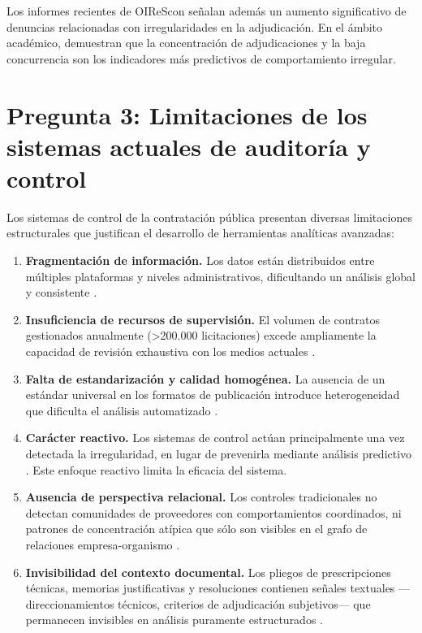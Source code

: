 \documentclass[11pt,a4paper,spanish]{book}
\numberwithin{equation}{chapter}
\numberwithin{figure}{chapter}
\begin{document}
Los informes recientes de OIReScon \cite{OIReScon2025} se{\~n}alan adem{\'a}s un aumento significativo de denuncias relacionadas con irregularidades en la adjudicaci{\'o}n. En el {\'a}mbito acad{\'e}mico,  demuestran que la concentraci{\'o}n de adjudicaciones y la baja concurrencia son los indicadores m{\'a}s predictivos de comportamiento irregular.

\section{Pregunta 3: Limitaciones de los sistemas actuales de auditor{\'i}a y control}

Los sistemas de control de la contrataci{\'o}n p{\'u}blica presentan diversas limitaciones estructurales que justifican el desarrollo de herramientas anal{\'i}ticas avanzadas:

\begin{enumerate}
  \item \textbf{Fragmentaci{\'o}n de informaci{\'o}n.} Los datos est{\'a}n distribuidos entre m{\'u}ltiples plataformas y niveles administrativos, dificultando un an{\'a}lisis global y consistente \cite{OIReScon2025}.

  \item \textbf{Insuficiencia de recursos de supervisi{\'o}n.} El volumen de contratos gestionados anualmente (\textgreater200.000 licitaciones) excede ampliamente la capacidad de revisi{\'o}n exhaustiva con los medios actuales \cite{OIReScon2025}.

  \item \textbf{Falta de estandarizaci{\'o}n y calidad homog{\'e}nea.} La ausencia de un est{\'a}ndar universal en los formatos de publicaci{\'o}n introduce heterogeneidad que dificulta el an{\'a}lisis automatizado \cite{OCP2023EUOpenData}.

  \item \textbf{Car{\'a}cter reactivo.} Los sistemas de control act{\'u}an principalmente una vez detectada la irregularidad, en lugar de prevenirla mediante an{\'a}lisis predictivo \cite{OECD2016Corruption}. Este enfoque reactivo limita la eficacia del sistema.

  \item \textbf{Ausencia de perspectiva relacional.} Los controles tradicionales no detectan comunidades de proveedores con comportamientos coordinados, ni patrones de concentraci{\'o}n at{\'i}pica que s{\'o}lo son visibles en el grafo de relaciones empresa-organismo \cite{Wachs2025ML,Martins2022Network}.

  \item \textbf{Invisibilidad del contexto documental.} Los pliegos de prescripciones t{\'e}cnicas, memorias justificativas y resoluciones contienen se{\~n}ales textuales ---direc\-cionamientos t{\'e}cnicos, criterios de adjudicaci{\'o}n subjetivos--- que permanecen invisibles en an{\'a}lisis puramente estructurados \cite{NLPLegalSurvey2024}.
\end{enumerate}
\end{document}
